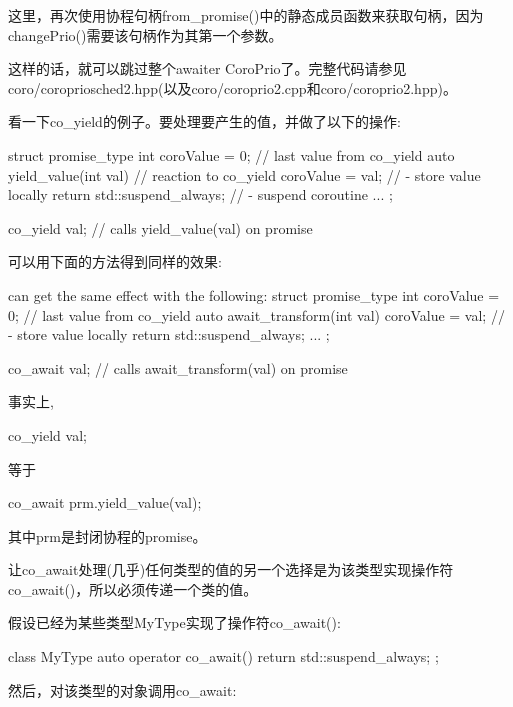 这里，再次使用协程句柄from\_promise()中的静态成员函数来获取句柄，因为changePrio()需要该句柄作为其第一个参数。

这样的话，就可以跳过整个awaiter CoroPrio了。完整代码请参见coro/coropriosched2.hpp(以及coro/coroprio2.cpp和coro/coroprio2.hpp)。


看一下co\_yield的例子。要处理要产生的值，并做了以下的操作:

\begin{cpp}
struct promise_type {
	int coroValue = 0; // last value from co_yield
	auto yield_value(int val) { // reaction to co_yield
		coroValue = val; // - store value locally
		return std::suspend_always{}; // - suspend coroutine
	}
	...
};

co_yield val; // calls yield_value(val) on promise
\end{cpp}

可以用下面的方法得到同样的效果:

\begin{cpp}
 can get the same effect with the following:
struct promise_type {
	int coroValue = 0; // last value from co_yield
	auto await_transform(int val) {
		coroValue = val; // - store value locally
		return std::suspend_always{};
	}
	...
};

co_await val; // calls await_transform(val) on promise
\end{cpp}

事实上,

\begin{cpp}
co_yield val;
\end{cpp}

等于

\begin{cpp}
co_await prm.yield_value(val);
\end{cpp}

其中prm是封闭协程的promise。


让co\_await处理(几乎)任何类型的值的另一个选择是为该类型实现操作符co\_await()，所以必须传递一个类的值。

假设已经为某些类型MyType实现了操作符co\_await():

\begin{cpp}
class MyType {
	auto operator co_await() {
		return std::suspend_always{};
	}
};
\end{cpp}

然后，对该类型的对象调用co\_await:

